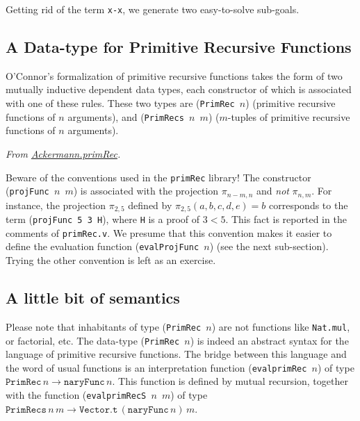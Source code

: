   Getting rid of the term \texttt{x-x}, we generate two easy-to-solve sub-goals.

\vspace{6pt}
\noindent

  
\subsection{A Data-type for Primitive Recursive Functions}

O'Connor's formalization of primitive recursive functions takes the form of two mutually inductive dependent data types, each constructor of which is associated with one of these  rules.
These two types are (\texttt{PrimRec $n$}) (primitive recursive functions of $n$ arguments), and
(\texttt{PrimRecs $n$ $m$}) ($m$-tuples of primitive recursive functions of $n$ arguments).



\label{def:Primrec}
\vspace{4pt}
\noindent
\emph{From \href{../theories/html/hydras.Ackermann.primRec.html}{Ackermann.primRec}.}



\begin{remark}
\label{projFunc-order-of-args}
Beware of the conventions used in the \texttt{primRec} library!
The constructor (\texttt{projFunc $n$ $m$})  is associated with the projection $\pi_{n-m,n}$ and \emph{not}
$\pi_{n, m}$.
For instance, the projection $\pi_{2,5}$ defined by $\pi_{2,5}(a,b,c,d,e)=b$ corresponds to the term
(\texttt{projFunc 5 3 H}), where \texttt{H} is a proof of $3<5$.
 This fact is reported in the comments of \texttt{primRec.v}. We presume that this convention makes it easier to define the evaluation function (\texttt{evalProjFunc $n$}) (see the next sub-section). Trying the other convention is left as an exercise.
\end{remark}



\subsection{A little bit of semantics} 
Please note that inhabitants of type (\texttt{PrimRec $n$}) are not \coq{} functions like \texttt{Nat.mul}, or factorial, etc. The data-type (\texttt{PrimRec $n$}) is indeed an abstract syntax for the language of primitive recursive functions. The bridge between this language and the word of usual functions
is an interpretation function (\texttt{evalprimRec $n$})  of type
$\texttt{PrimRec}\,n \rightarrow  \texttt{naryFunc}\,n$.
This function is defined by mutual recursion,  together with the  function 
(\texttt{evalprimRecS $n$ $m$}) of type 
$\texttt{PrimRecs}\,n\,m \rightarrow  \texttt{Vector.t}\,(\texttt{naryFunc}\,n)\,m$.

